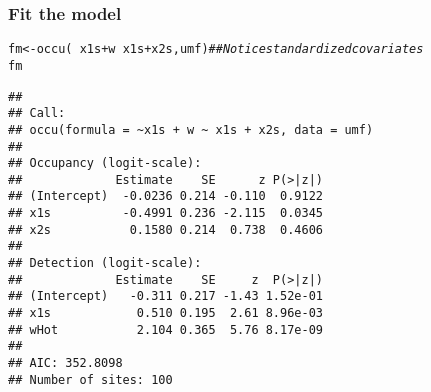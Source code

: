 \documentclass[color=usenames,dvipsnames]{beamer}\usepackage[]{graphicx}\usepackage[]{xcolor}
\makeatletter
\newcommand{\hlcom}[1]{\textcolor[rgb]{0.514,0.506,0.514}{\textit{#1}}}%
\newcommand{\hlopt}[1]{\textcolor[rgb]{0,0,0}{#1}}%
\newcommand{\hldef}[1]{\textcolor[rgb]{0,0,0}{#1}}%
\newcommand{\hlkwb}[1]{\textcolor[rgb]{0,0.341,0.682}{#1}}%
\newcommand{\hlkwd}[1]{\textcolor[rgb]{0.004,0.004,0.506}{#1}}%
\newenvironment{kframe}{%
 \def\at@end@of@kframe{}%
 \ifinner\ifhmode%
  \def\at@end@of@kframe{\end{minipage}}%
  \begin{minipage}{\columnwidth}%
 \fi\fi%
 \def\FrameCommand##1{\hskip\@totalleftmargin \hskip-\fboxsep
 \colorbox{shadecolor}{##1}\hskip-\fboxsep
     \hskip-\linewidth \hskip-\@totalleftmargin \hskip\columnwidth}%
 \MakeFramed {\advance\hsize-\width
   \@totalleftmargin\z@ \linewidth\hsize
   \@setminipage}}%
 {\par\unskip\endMakeFramed%
 \at@end@of@kframe}
\newenvironment{knitrout}{}{} %
\makeatother
\begin{document}
\begin{frame}[fragile]
  \frametitle{Fit the model}
  \footnotesize
\begin{knitrout}\scriptsize
{}\color{fgcolor}\begin{kframe}
\begin{alltt}
\hldef{fm} \hlkwb{<-} \hlkwd{occu}\hldef{(}\hlopt{~}\hldef{x1s}\hlopt{+}\hldef{w} \hlopt{~}\hldef{x1s}\hlopt{+}\hldef{x2s, umf)}    \hlcom{## Notice standardized covariates}
\hldef{fm}
\end{alltt}
\begin{verbatim}
## 
## Call:
## occu(formula = ~x1s + w ~ x1s + x2s, data = umf)
## 
## Occupancy (logit-scale):
##             Estimate    SE      z P(>|z|)
## (Intercept)  -0.0236 0.214 -0.110  0.9122
## x1s          -0.4991 0.236 -2.115  0.0345
## x2s           0.1580 0.214  0.738  0.4606
## 
## Detection (logit-scale):
##             Estimate    SE     z  P(>|z|)
## (Intercept)   -0.311 0.217 -1.43 1.52e-01
## x1s            0.510 0.195  2.61 8.96e-03
## wHot           2.104 0.365  5.76 8.17e-09
## 
## AIC: 352.8098 
## Number of sites: 100
\end{verbatim}
\end{kframe}
\end{knitrout}
\end{frame}
\end{document}
